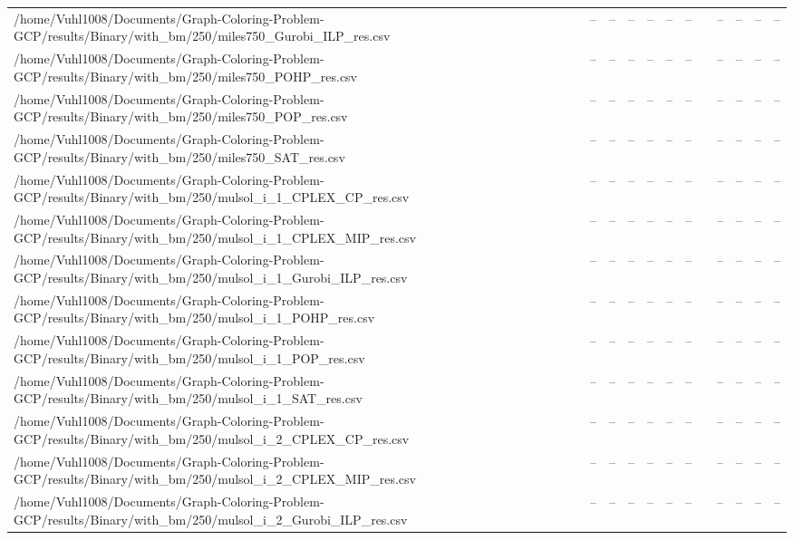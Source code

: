 \begin{table}[htbp]
\begin{tabular}{llllllllllll}
/home/Vuhl1008/Documents/Graph-Coloring-Problem-GCP/results/Binary/with\_bm/250/miles750\_Gurobi\_ILP\_res.csv & -- & -- & -- & -- & -- & -- & {} & -- & -- & -- & -- \\
/home/Vuhl1008/Documents/Graph-Coloring-Problem-GCP/results/Binary/with\_bm/250/miles750\_POHP\_res.csv & -- & -- & -- & -- & -- & -- & {} & -- & -- & -- & -- \\
/home/Vuhl1008/Documents/Graph-Coloring-Problem-GCP/results/Binary/with\_bm/250/miles750\_POP\_res.csv & -- & -- & -- & -- & -- & -- & {} & -- & -- & -- & -- \\
/home/Vuhl1008/Documents/Graph-Coloring-Problem-GCP/results/Binary/with\_bm/250/miles750\_SAT\_res.csv & -- & -- & -- & -- & -- & -- & {} & -- & -- & -- & -- \\
/home/Vuhl1008/Documents/Graph-Coloring-Problem-GCP/results/Binary/with\_bm/250/mulsol\_i\_1\_CPLEX\_CP\_res.csv & -- & -- & -- & -- & -- & -- & {} & -- & -- & -- & -- \\
/home/Vuhl1008/Documents/Graph-Coloring-Problem-GCP/results/Binary/with\_bm/250/mulsol\_i\_1\_CPLEX\_MIP\_res.csv & -- & -- & -- & -- & -- & -- & {} & -- & -- & -- & -- \\
/home/Vuhl1008/Documents/Graph-Coloring-Problem-GCP/results/Binary/with\_bm/250/mulsol\_i\_1\_Gurobi\_ILP\_res.csv & -- & -- & -- & -- & -- & -- & {} & -- & -- & -- & -- \\
/home/Vuhl1008/Documents/Graph-Coloring-Problem-GCP/results/Binary/with\_bm/250/mulsol\_i\_1\_POHP\_res.csv & -- & -- & -- & -- & -- & -- & {} & -- & -- & -- & -- \\
/home/Vuhl1008/Documents/Graph-Coloring-Problem-GCP/results/Binary/with\_bm/250/mulsol\_i\_1\_POP\_res.csv & -- & -- & -- & -- & -- & -- & {} & -- & -- & -- & -- \\
/home/Vuhl1008/Documents/Graph-Coloring-Problem-GCP/results/Binary/with\_bm/250/mulsol\_i\_1\_SAT\_res.csv & -- & -- & -- & -- & -- & -- & {} & -- & -- & -- & -- \\
/home/Vuhl1008/Documents/Graph-Coloring-Problem-GCP/results/Binary/with\_bm/250/mulsol\_i\_2\_CPLEX\_CP\_res.csv & -- & -- & -- & -- & -- & -- & {} & -- & -- & -- & -- \\
/home/Vuhl1008/Documents/Graph-Coloring-Problem-GCP/results/Binary/with\_bm/250/mulsol\_i\_2\_CPLEX\_MIP\_res.csv & -- & -- & -- & -- & -- & -- & {} & -- & -- & -- & -- \\
/home/Vuhl1008/Documents/Graph-Coloring-Problem-GCP/results/Binary/with\_bm/250/mulsol\_i\_2\_Gurobi\_ILP\_res.csv & -- & -- & -- & -- & -- & -- & {} & -- & -- & -- & -- \\

\end{tabular}
\end{table}
